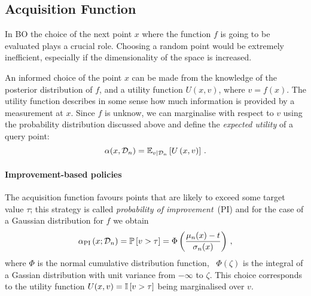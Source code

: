 \subsection{Acquisition Function}
\label{sec:AcqFun}

In BO the choice of the next point $x$ where the function $f$ is going to be
evaluated plays a crucial role. Choosing a random point would be extremely
inefficient, especially if the dimensionality of the space is increased. 

An informed choice of the point $x$ can be made from the knowledge of the
posterior distribution of $f$, and a utility function $U(x,v)$, where $v=f(x)$.
The utility function describes in some sense how much information is provided by
a measurement at $x$. Since $f$ is unknow, we can marginalise with respect to
$v$ using the probability distribution discussed above and define the {\em
expected utility} of a query point:
\begin{equation}
    \label{eq:ExpUtilDef}
    \alpha(x,\mathcal{D}_n) = \mathbb{E}_{v|\mathcal{D}_n}\left[U\left(x,v\right)\right]\, .
\end{equation} 

\paragraph[]{Improvement-based policies}

The acquisition function favours points that are likely to exceed some target value $\tau$; this strategy is called {\em probability of improvement}\ (PI) and for the case of a Gaussian distribution for $f$ we obtain
\begin{equation}
    \label{eq:AlphaPI}
    \alpha_{\mathrm{PI}}\left(x;\mathcal{D}_n\right) = 
    \mathbb{P}\left[v>\tau\right] = 
    \Phi\left(
        \frac{\mu_n(x)-t}{\sigma_n(x)}    
    \right)\, ,
\end{equation}
where $\Phi$ is the normal cumulative distribution function, \ie\ $\Phi(\zeta)$
is the integral of a Gassian distribution with unit variance from $-\infty$ to
$\zeta$. This choice corresponds to the utility function $U(x,v)=\mathbb{I}\left[v>\tau\right]$ being marginalised over $v$.

